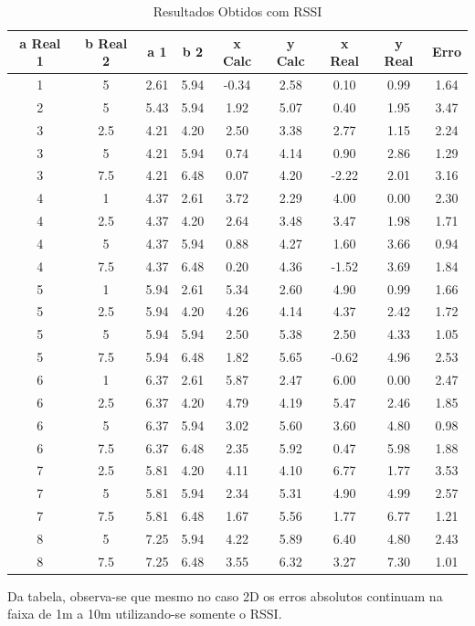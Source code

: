 \begin{table}[t]
    \centering
    \begin{tabular}{||c c c c c c c c c||}
    \hline
    a Real 1 & b Real 2 & a 1 & b 2 & x Calc & y Calc	& x Real & y Real & Erro\\ [0.5ex]
    \hline\hline
    1 & 5 & 2.61 & 5.94 & -0.34 & 2.58 & 0.10 & 0.99 & 1.64\\
    \hline
    2 & 5 & 5.43 & 5.94 & 1.92 & 5.07 & 0.40 & 1.95 & 3.47\\
    \hline
    3 & 2.5 & 4.21 & 4.20 & 2.50 & 3.38 & 2.77 & 1.15 & 2.24\\
    \hline
    3 & 5 & 4.21 & 5.94 & 0.74 & 4.14 & 0.90 & 2.86 & 1.29\\
    \hline
    3 & 7.5 & 4.21 & 6.48 & 0.07 & 4.20 & -2.22 & 2.01 & 3.16\\
    \hline
    4 & 1 & 4.37 & 2.61 & 3.72 & 2.29 & 4.00 & 0.00 & 2.30\\
    \hline
    4 & 2.5 & 4.37 & 4.20 & 2.64 & 3.48 & 3.47 & 1.98 & 1.71\\
    \hline
    4 & 5 & 4.37 & 5.94 & 0.88 & 4.27 & 1.60 & 3.66 & 0.94\\
    \hline
    4 & 7.5 & 4.37 & 6.48 & 0.20 & 4.36 & -1.52 & 3.69 & 1.84\\
    \hline
    5 & 1 & 5.94 & 2.61 & 5.34 & 2.60 & 4.90 & 0.99 & 1.66\\
    \hline
    5 & 2.5 & 5.94 & 4.20 & 4.26 & 4.14 & 4.37 & 2.42 & 1.72\\
    \hline
    5 & 5 & 5.94 & 5.94 & 2.50 & 5.38 & 2.50 & 4.33 & 1.05\\
    \hline
    5 & 7.5 & 5.94 & 6.48 & 1.82 & 5.65 & -0.62 & 4.96 & 2.53\\
    \hline
    6 & 1 & 6.37 & 2.61 & 5.87 & 2.47 & 6.00 & 0.00 & 2.47\\
    \hline
    6 & 2.5 & 6.37 & 4.20 & 4.79 & 4.19 & 5.47 & 2.46 & 1.85\\
    \hline
    6 & 5 & 6.37 & 5.94 & 3.02 & 5.60 & 3.60 & 4.80 & 0.98\\
    \hline
    6 & 7.5 & 6.37 & 6.48 & 2.35 & 5.92 & 0.47 & 5.98 & 1.88\\
    \hline
    7 & 2.5 & 5.81 & 4.20 & 4.11 & 4.10 & 6.77 & 1.77 & 3.53\\
    \hline
    7 & 5 & 5.81 & 5.94 & 2.34 & 5.31 & 4.90 & 4.99 & 2.57\\
    \hline
    7 & 7.5 & 5.81 & 6.48 & 1.67 & 5.56 & 1.77 & 6.77 & 1.21\\
    \hline
    8 & 5 & 7.25 & 5.94 & 4.22 & 5.89 & 6.40 & 4.80 & 2.43\\
    \hline
    8 & 7.5 & 7.25 & 6.48 & 3.55 & 6.32 & 3.27 & 7.30 & 1.01\\ [0.5ex]
    \hline
   \end{tabular}
   \caption{Resultados Obtidos com RSSI}
   \label{tab: Resultados Obtidos com RSSI}
\end{table}

   Da tabela, observa-se que mesmo no caso 2D os erros absolutos continuam na faixa de 1m a 10m utilizando-se somente o RSSI.
